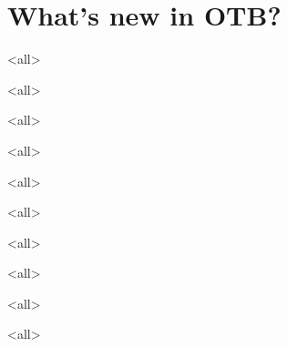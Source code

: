 \section{What's new in OTB?}

\mode<all>


\mode<all>


\mode<all>


\mode<all>


\mode<all>


\mode<all>


\mode<all>


\mode<all>


\mode<all>


\mode<all>















